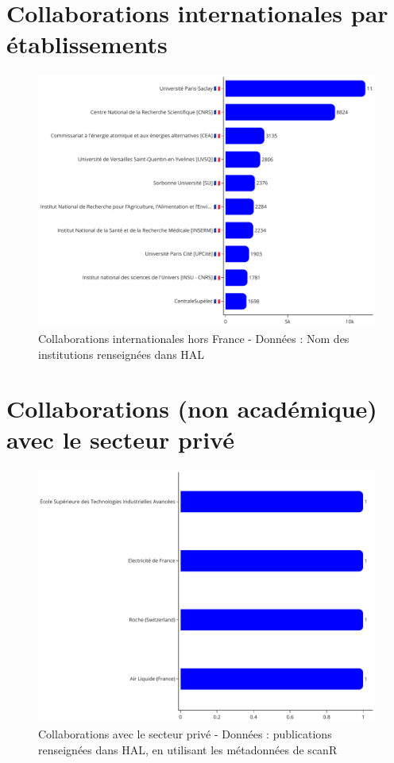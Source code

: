 \documentclass[french, 11pt]{dibiso/biso}
\begin{document}
\pagebreak

\section{Collaborations internationales par établissements}

\begin{figure}[!h]
  \includegraphics[width=\textwidth]{figures/collaboration_names.pdf}
  \caption{Collaborations internationales hors France - Données : Nom des institutions renseignées dans HAL}
  \label{fig_collab_names}
\end{figure}

\pagebreak

\section{Collaborations (non académique) avec le secteur privé}

\begin{figure}[!h]
  \includegraphics[width=\textwidth]{figures/private_sector_collaborations.pdf}
  \centering
  \caption{Collaborations avec le secteur privé - Données : publications renseignées dans HAL, en utilisant les métadonnées de scanR}
  \label{fig_private_collab}
\end{figure}
\end{document}
